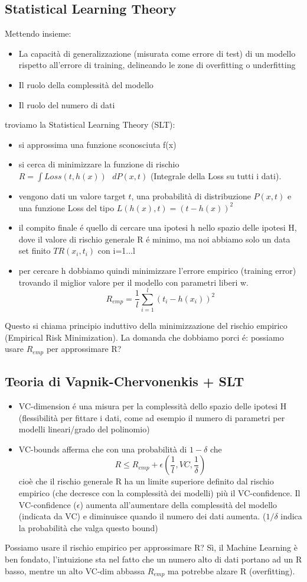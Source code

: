 \documentclass{article}
\begin{document}
\subsection{Statistical Learning Theory}
Mettendo insieme: 
\begin{itemize}
    \item La capacità di generalizzazione (misurata come errore di test) di un modello rispetto all'errore di training, delineando le zone di overfitting o underfitting
    \item Il ruolo della complessità del modello
    \item Il ruolo del numero di dati
\end{itemize}
troviamo la Statistical Learning Theory (SLT):
\begin{itemize}
    \item si approssima una funzione sconosciuta f(x)
    \item si cerca di minimizzare la funzione di rischio $R=\int Loss(t,h(x))\text{ }dP(x,t)$ (Integrale della Loss su tutti i dati).
    \item vengono dati un valore target $t$, una probabilità di distribuzione $P(x,t)$ e una funzione Loss del tipo $L(h(x),t)=(t-h(x))^2$
    \item il compito finale é quello di cercare una ipotesi h nello spazio delle ipotesi H, dove il valore di rischio generale R é minimo, ma noi abbiamo solo un data set finito $TR(x_i,t_i)$ con i=1...l
    \item per cercare h dobbiamo quindi minimizzare l'errore empirico (training error) trovando il miglior valore per il modello con parametri liberi w. \[R_{emp}=\frac{1}{l}\sum_{i = 1}^l (t_i-h(x_i))^2\]
\end{itemize}
Questo si chiama principio induttivo della minimizzazione del rischio empirico (Empirical Risk Minimization). La domanda che dobbiamo porci é: possiamo usare $R_{emp}$ per approssimare R?

\subsection{Teoria di Vapnik-Chervonenkis + SLT}
\begin{itemize}
    \item VC-dimension é una misura per la complessità dello spazio delle ipotesi H (flessibilità per fittare i dati, come ad esempio il numero di parametri per modelli lineari/grado del polinomio)
    \item VC-bounds afferma che con una probabilità di $1-\delta$ che \[ R \leq R_{emp} + \epsilon(\frac{1}{l},VC,\frac{1}{\delta})\]
    cioè che il rischio generale R ha un limite superiore definito dal rischio empirico (che decresce con la complessità dei modelli) più il VC-confidence. Il VC-confidence ($\epsilon$) aumenta all'aumentare della complessità del modello (indicata da VC) e diminuisce quando il numero dei dati aumenta. ($1/\delta$ indica la probabilità che valga questo bound)
\end{itemize}
Possiamo usare il rischio empirico per approssimare R? Sì, il Machine Learning è ben fondato, l'intuizione sta nel fatto che un numero alto di dati portano ad un R basso, mentre un alto VC-dim abbassa $R_{emp}$ ma potrebbe alzare R (overfitting).
\end{document}
